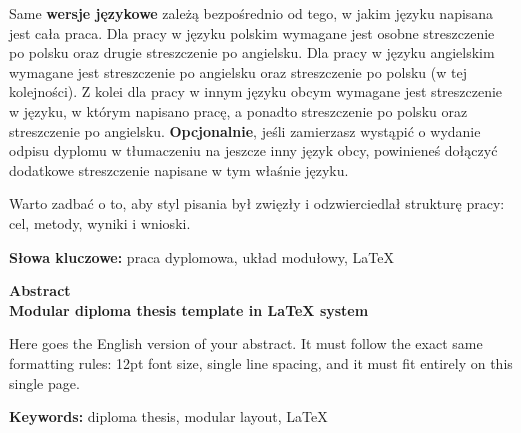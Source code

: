 \documentclass[11pt, a4paper, twoside]{report}
\begin{document}
Same \textbf{wersje językowe} zależą bezpośrednio od tego, w jakim języku napisana jest cała praca. Dla pracy w języku polskim wymagane jest osobne streszczenie po polsku oraz drugie streszczenie po angielsku. Dla pracy w języku angielskim wymagane jest streszczenie po angielsku oraz streszczenie po polsku (w tej kolejności). Z kolei dla pracy w innym języku obcym wymagane jest streszczenie w języku, w którym napisano pracę, a ponadto streszczenie po polsku oraz streszczenie po angielsku. \textbf{Opcjonalnie}, jeśli zamierzasz wystąpić o wydanie odpisu dyplomu w tłumaczeniu na jeszcze inny język obcy, powinieneś dołączyć dodatkowe streszczenie napisane w tym właśnie języku.

Warto zadbać o to, aby styl pisania był zwięzły i odzwierciedlał strukturę pracy: cel, metody, wyniki i wnioski.

\vspace{1.0cm} %
\noindent \textbf{Słowa kluczowe:} praca dyplomowa, układ modułowy, \LaTeX{}

\endgroup
\clearpage %


\clearpage\thispagestyle{empty}\mbox{}\clearpage

\thispagestyle{plain}
\begingroup
\fontsize{12pt}{14pt}\selectfont 

\begin{center}
	\textbf{Abstract} \\[0.5cm]
	\textbf{Modular diploma thesis template in LaTeX system}
\end{center}

\vspace{0.5cm}

\noindent Here goes the English version of your abstract. It must follow the exact same formatting rules: 12pt font size, single line spacing, and it must fit entirely on this single page.

\vspace{1.0cm}

\noindent \textbf{Keywords:} diploma thesis, modular layout, \LaTeX{}
\endgroup
\clearpage %

\end{document}
